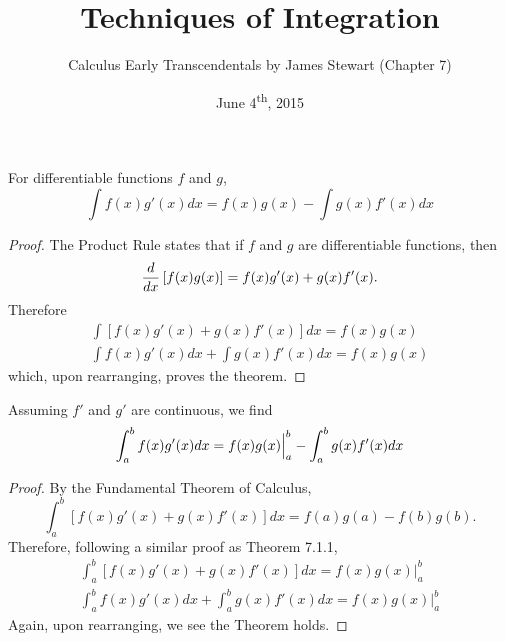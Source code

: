 \documentclass[a4paper,11pt]{article}
\title{Techniques of Integration}
\author{Calculus Early Transcendentals by James Stewart (Chapter 7)}
\date{June 4\textsuperscript{th}, 2015}
\begin{document}
\maketitle
{}

\begin{outline}

    For differentiable functions \(f\) and \(g\), \[ \int f(x)g'(x)dx = f(x)g(x) - \int g(x)f'(x)dx \]
    
    \begin{proof}
      The Product Rule states that if \(f\) and \(g\) are differentiable functions, then
      \[
        \frac{d}{dx}\left[f(x)g(x)\right] = f(x)g'(x) + g(x)f'(x)\text{.}
      \]
      Therefore
      \begin{gather*}
        \int\left[f(x)g'(x)+g(x)f'(x)\right]dx = f(x)g(x) \\
        \int f(x)g'(x)dx + \int g(x)f'(x)dx = f(x)g(x)
      \end{gather*}
      which, upon rearranging, proves the theorem.
    \end{proof}
    
    Assuming \(f'\) and \(g'\) are continuous, we find
    \[
      \int_a^b f(x)g'(x)dx = f(x)g(x)\Big{\vert}_a^b - \int_a^b g(x)f'(x)dx 
    \]
    
    \begin{proof}
      By the Fundamental Theorem of Calculus, 
      \[
        \int_a^b\left[f(x)g'(x)+g(x)f'(x)\right]dx = f(a)g(a) - f(b)g(b)\text{.}
      \]
      Therefore, following a similar proof as Theorem 7.1.1,
      \begin{gather*}
        \int_a^b\left[f(x)g'(x)+g(x)f'(x)\right]dx = f(x)g(x)\Big\vert_a^b \\
        \int_a^b f(x)g'(x)dx + \int_a^b g(x)f'(x)dx = f(x)g(x)\Big\vert_a^b
      \end{gather*}
      Again, upon rearranging, we see the Theorem holds.
    \end{proof}

\end{outline}
\end{document}
